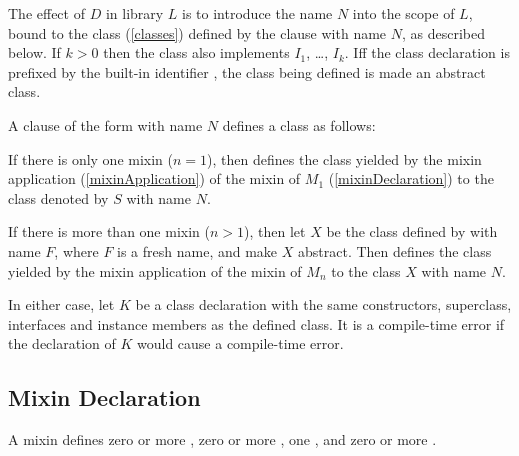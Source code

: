 \documentclass[makeidx]{article}
\begin{document}
\LMHash{}%
The effect of $D$ in library $L$ is to introduce the name $N$ into
the scope of $L$, bound to the class (\ref{classes}) defined by the clause
with name $N$, as described below.
If $k > 0$ then the class also implements $I_1$, \ldots, $I_k$.
If{}f the class declaration is prefixed by the built-in identifier \ABSTRACT,
the class being defined is made an abstract class.

\LMHash{}%
A clause of the form 
with name $N$ defines a class as follows:

\LMHash{}%
If there is only one mixin ($n = 1$), then 
defines the class yielded by the mixin application (\ref{mixinApplication})
of the mixin of $M_1$ (\ref{mixinDeclaration}) to the class denoted by
$S$ with name $N$.

\LMHash{}%
If there is more than one mixin ($n > 1$), then
let $X$ be the class defined by 
with name $F$, where $F$ is a fresh name, and make $X$ abstract.
Then  defines the class yielded
by the mixin application of the mixin of $M_n$ to the class $X$ with name $N$.

\LMHash{}%
In either case, let $K$ be a class declaration with
the same constructors, superclass, interfaces and instance members as
the defined class.
It is a compile-time error if the declaration of $K$ would cause
a compile-time error.


\subsection{Mixin Declaration}

\LMHash{}%
A mixin defines zero or more
,
zero or more
,
one
,
and zero or more
.
\end{document}
